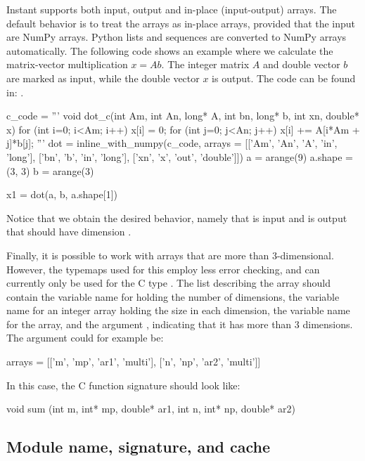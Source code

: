 Instant supports both input, output and in-place (input-output) arrays.  
The default
behavior is to treat the arrays as in-place arrays, provided that the
input are NumPy arrays. Python lists and sequences are converted to
NumPy arrays automatically.  The following code shows an example where
we calculate the matrix-vector multiplication $x = Ab$. The integer
matrix $A$ and double vector $b$ are marked as input, while the double
vector $x$ is output. The code can be found in: .
\begin{python}
c_code = '''
void dot_c(int Am, int An, long* A, int bn, long* b, int xn, double* x)
{
    for (int i=0; i<Am; i++)
    {
        x[i] = 0;
        for (int j=0; j<An; j++)
        {
            x[i] += A[i*Am + j]*b[j];
        }
    }
}
'''
dot = inline_with_numpy(c_code,
                          arrays = [['Am', 'An', 'A', 'in', 'long'],
                                    ['bn', 'b', 'in', 'long'],
                                    ['xn', 'x', 'out', 'double']])
a = arange(9)
a.shape = (3, 3)
b = arange(3)

x1 = dot(a, b, a.shape[1])
\end{python}
Notice that we obtain the desired behavior, namely that  is 
input and  is output that should have dimension .  

Finally, it is possible to work with arrays that are more than
3-dimensional.  However, the typemaps used for this employ less error
checking, and can currently only be used for the C
type . The list describing the array should contain the
variable name for holding the number of dimensions, the variable name
for an integer array holding the size in each dimension, the variable
name for the array, and the argument , indicating that it
has more than 3 dimensions. The  argument could for
example be:
\begin{python}
arrays = [['m', 'mp', 'ar1', 'multi'],
          ['n', 'np', 'ar2', 'multi']]
\end{python}
In this case, the C function signature should look like:
\begin{c++}
void sum (int m, int* mp, double* ar1, int n,
          int* np, double* ar2)
\end{c++}

\subsection{Module name, signature, and cache}\label{wilbers:sec:msc}

